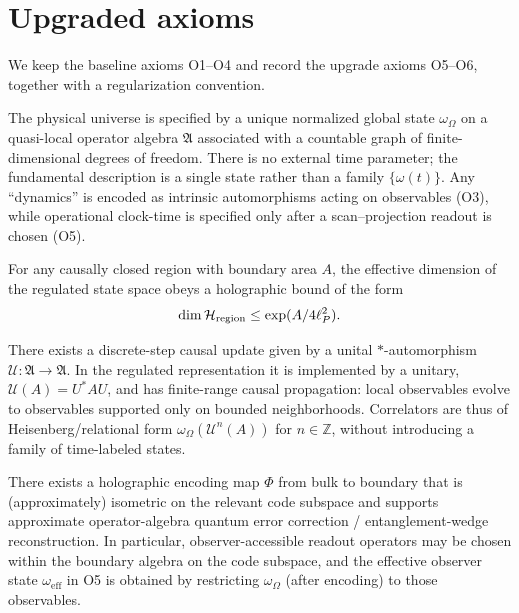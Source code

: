 \section{Upgraded axioms}
We keep the baseline axioms O1--O4 and record the upgrade axioms O5--O6, together with a regularization convention.

\begin{axiom}
The physical universe is specified by a unique normalized global state $\omega_{\Omega}$ on a quasi-local operator algebra $\mathfrak{A}$ associated with a countable graph of finite-dimensional degrees of freedom. There is no external time parameter; the fundamental description is a single state rather than a family $\{\omega(t)\}$. Any ``dynamics'' is encoded as intrinsic automorphisms acting on observables (O3), while operational clock-time is specified only after a scan--projection readout is chosen (O5).
\end{axiom}

\begin{axiom}
For any causally closed region with boundary area $A$, the effective dimension of the regulated state space obeys a holographic bound of the form
\begin{equation}
    \dim \mathcal{H}_{\mathrm{region}}\le \exp(A/4\ell_P^2).
\end{equation}
\end{axiom}

\begin{axiom}
There exists a discrete-step causal update given by a unital $*$-automorphism $\mathcal{U}:\mathfrak{A}\to\mathfrak{A}$. In the regulated representation it is implemented by a unitary, $\mathcal{U}(A)=U^{*}AU$, and has finite-range causal propagation: local observables evolve to observables supported only on bounded neighborhoods. Correlators are thus of Heisenberg/relational form $\omega_{\Omega}(\mathcal{U}^{n}(A))$ for $n\in\mathbb{Z}$, without introducing a family of time-labeled states.
\end{axiom}

\begin{axiom}
There exists a holographic encoding map $\Phi$ from bulk to boundary that is (approximately) isometric on the relevant code subspace and supports approximate operator-algebra quantum error correction / entanglement-wedge reconstruction. In particular, observer-accessible readout operators may be chosen within the boundary algebra on the code subspace, and the effective observer state $\omega_{\mathrm{eff}}$ in O5 is obtained by restricting $\omega_{\Omega}$ (after encoding) to those observables.
\end{axiom}

